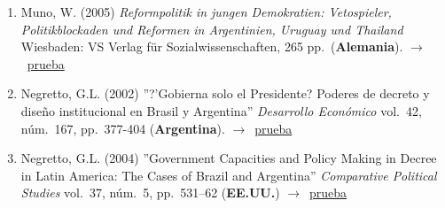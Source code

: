 \documentclass[12 pt, letter]{article}
\newenvironment{CitasMiTrabajo}{
    \begin{footnotesize}
    \begin{enumerate}[label={\footnotesize\emph{cita~\arabic*}},ref=\arabic*] %
        \setlength{\itemsep}{.1\itemsep}
        \setlength{\parskip}{.1\parskip}
    }{\end{enumerate}\end{footnotesize}}
\begin{document}

        \begin{CitasMiTrabajo}

        \item Muno, W. (2005)
        \emph{Reformpolitik in jungen Demokratien:
        Vetospieler, Politikblockaden und Reformen in Argentinien, Uruguay und
        Thailand} Wiesbaden: VS Verlag f\"ur Sozialwissenschaften, 265 pp.\ (\textbf{Alemania}). $\rightarrow$~\href{https://github.com/emagar/cv/blob/master/citasMiTrab/decreeArg/muno.pdf}{prueba}

        \item Negretto, G.L. (2002)
        ''?'Gobierna solo el Presidente? Poderes de decreto y dise\~no institucional en Brasil y Argentina'' \emph{Desarrollo Econ\'omico}
        vol.\ 42, n\'um.\ 167, pp.\ 377-404 (\textbf{Argentina}). $\rightarrow$~\href{https://github.com/emagar/cv/blob/master/citasMiTrab/decreeArg/negre2.pdf}{prueba}

        \item Negretto, G.L. (2004)
        ''Government Capacities and Policy Making in
        Decree in Latin America: The Cases of Brazil and Argentina''
        \emph{Comparative Political Studies} vol.\ 37, n\'um.\ 5, pp.\ 531--62 (\textbf{EE.UU.}) $\rightarrow$~\href{https://github.com/emagar/cv/blob/master/citasMiTrab/decreeArg/negre.pdf}{prueba}

        \label{ncites:magarArgDecrees2001} %

        \end{CitasMiTrabajo}





\end{document}
